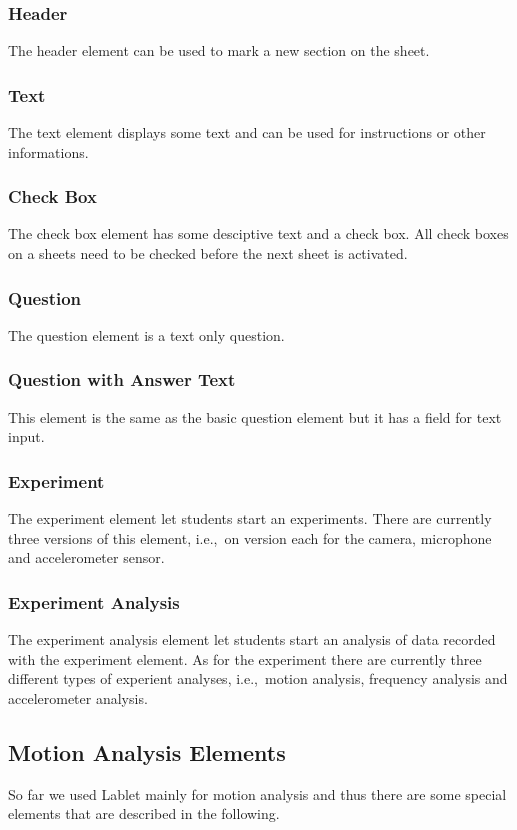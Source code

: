 \documentclass{sigchi}
\newcommand{\ie}{i.e.,\ }
\begin{document}
\subsubsection*{Header}
The header element can be used to mark a new section on the sheet.

\subsubsection*{Text}
The text element displays some text and can be used for instructions or other informations. 

\subsubsection*{Check Box}
The check box element has some desciptive text and a check box.
All check boxes on a sheets need to be checked before the next sheet is activated.

\subsubsection*{Question}
The question element is a text only question.

\subsubsection*{Question with Answer Text}
This element is the same as the basic question element but it has a field for text input.

\subsubsection*{Experiment}
The experiment element let students start an experiments.
There are currently three versions of this element, \ie on version each for the camera, microphone and accelerometer sensor.

\subsubsection*{Experiment Analysis}
The experiment analysis element let students start an analysis of data recorded with the experiment element.
As for the experiment there are currently three different types of experient analyses, \ie motion analysis, frequency analysis and accelerometer analysis.

\subsection{Motion Analysis Elements}
So far we used Lablet mainly for motion analysis and thus there are some special elements that are described in the following.
\end{document}
